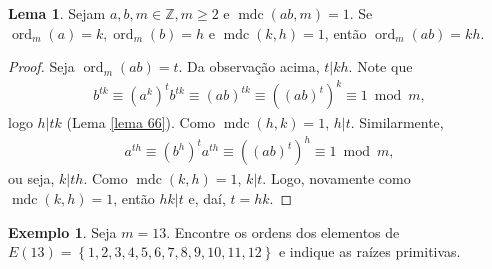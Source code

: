 \documentclass[a4paper,11pt,twoside, leqno]{article}
\DeclareMathOperator{\mdc}{mdc}
\DeclareMathOperator{\Ord}{ord}
\theoremstyle{definition}
\newtheorem{lemma}[theorem]{Lema}
\newtheorem*{example}{Exemplo}
\begin{document}
\begin{lemma}
	\label{lema 73} 
	Sejam $a,b,m\in\mathbb{Z}, m\geq 2$ e $\mdc(ab,m) = 1$. Se $\Ord_m(a) = k, \Ord_m(b) = h$ e $\mdc(k,h) = 1$, então $\Ord_m(ab) = kh$.
\end{lemma}
\begin{proof}
	Seja $\Ord_m(ab) = t$. Da observação acima, $t|kh$. Note que
	\begin{align*}
	b^{tk}\equiv (a^k)^tb^{tk}\equiv (ab)^{tk} \equiv ((ab)^t)^k\equiv 1\bmod m,
	\end{align*}
	logo $h|tk$ (Lema \eqref{lema 66}). Como $\mdc(h,k) = 1$, $h|t$. Similarmente,
	\begin{align*}
	a^{th}\equiv (b^h)^ta^{th}\equiv ((ab)^t)^h\equiv 1\bmod m,
	\end{align*}
	ou seja, $k|th$. Como $\mdc(k,h) = 1$, $k|t$. Logo, novamente como $\mdc(k,h) = 1$, então $hk|t$ e, daí, $t = hk$.
\end{proof}
\begin{example}
	Seja $m=13$. Encontre os ordens dos elementos de $E(13) = \left\{ 1,2,3,4,5,6,7,8,9,10,11,12 \right\}$ e indique as raízes primitivas.
\end{example}
\end{document}
